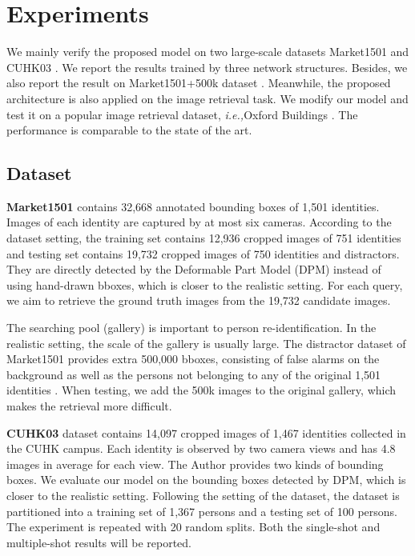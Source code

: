 \documentclass[journal]{IEEEtran}
\newcommand{\ie}{\mbox{\emph{i.e.,}}}
\begin{document}
\section{Experiments} \label{exp}
We mainly verify the proposed model on two large-scale datasets Market1501 \cite{zheng2015scalable} and CUHK03 \cite{li2014deepreid}. We report the results trained by three network structures. Besides, we also report the result on Market1501+500k dataset \cite{zheng2015scalable}. Meanwhile, the proposed architecture is also applied on the image retrieval task. We modify our model and test it on a popular image retrieval dataset, \ie  Oxford Buildings \cite{philbin2007object}. The performance is comparable to the state of the art.

\subsection{Dataset}
\textbf{Market1501} \cite{zheng2015scalable} contains 32,668 annotated bounding boxes of 1,501 identities. Images of each identity are captured by at most six cameras. According to the dataset setting, the training set contains 12,936 cropped images of 751 identities and testing set contains 19,732 cropped images of 750 identities and distractors. They are directly detected by the Deformable Part Model (DPM) instead of using hand-drawn bboxes, which is closer to the realistic setting. 
For each query, we aim to retrieve the ground truth images from the 19,732 candidate images.

The searching pool (gallery) is important to person re-identification. In the realistic setting, the scale of the gallery is usually large. The distractor dataset of Market1501 provides extra 500,000 bboxes, consisting of false alarms on the background as well as the persons not belonging to any of the original 1,501 identities \cite{zheng2015scalable}. When testing, we add the 500k images to the original gallery, which makes the retrieval more difficult.

\textbf{CUHK03} dataset \cite{li2014deepreid} contains 14,097 cropped images of 1,467 identities collected in the CUHK campus. Each identity is observed by two camera views and has 4.8 images in average for each view. The Author provides two kinds of bounding boxes. We evaluate our model on the bounding boxes detected by DPM, which is closer to the realistic setting. Following the setting of the dataset, the dataset is partitioned into a training set of 1,367 persons and a testing set of 100 persons. The experiment is repeated with 20 random splits. Both the single-shot and multiple-shot results will be reported.
\end{document}

